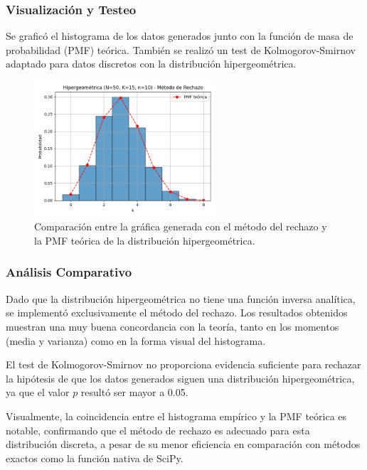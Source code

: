 \documentclass{article}
\begin{document}
\vspace{0.5em}
\subsubsection{Visualización y Testeo}

Se graficó el histograma de los datos generados junto con la función de masa de probabilidad (PMF) teórica. También se realizó un test de Kolmogorov-Smirnov adaptado para datos discretos con la distribución hipergeométrica.

\begin{figure}[H]
    \centering
    \includegraphics[width=0.6\textwidth]{visualizaciones/hipergeometrica_rechazo.png}
    \caption{Comparación entre la gráfica generada con el método del rechazo y la PMF teórica de la distribución hipergeométrica.}
    \label{fig:hipergeometrica_rechazo}
\end{figure}

\subsubsection{Análisis Comparativo}
Dado que la distribución hipergeométrica no tiene una función inversa analítica, se implementó exclusivamente el método del rechazo. Los resultados obtenidos muestran una muy buena concordancia con la teoría, tanto en los momentos (media y varianza) como en la forma visual del histograma.

El test de Kolmogorov-Smirnov no proporciona evidencia suficiente para rechazar la hipótesis de que los datos generados siguen una distribución hipergeométrica, ya que el valor $p$ resultó ser mayor a 0.05.

Visualmente, la coincidencia entre el histograma empírico y la PMF teórica es notable, confirmando que el método de rechazo es adecuado para esta distribución discreta, a pesar de su menor eficiencia en comparación con métodos exactos como la función nativa de SciPy.
\end{document}
